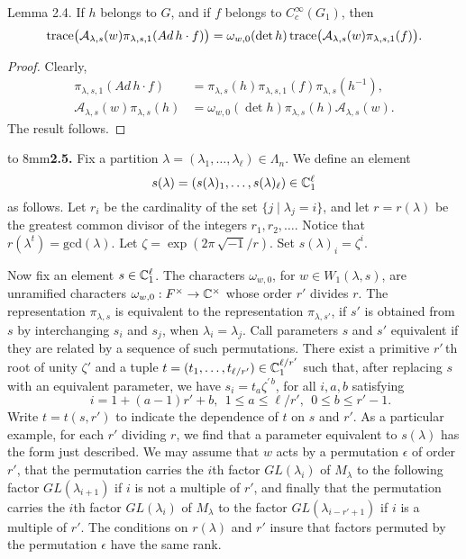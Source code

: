 \documentclass{amsart}
\begin{document}
\proclaim Lemma {2.4}.
If
  $ h $ belongs to $G$,
  and if $ f$ belongs to $C_c^{\infty} (G_1) $, then
%
$$
  \text{{\rm trace}}
  \bigl(
    {\mathcal A}_{\lambda,s} (w)
    \pi_{\lambda,s,1}
    (Ad\,h \cdot f)
  \bigr) 
=
  \omega_{w,0} 
  (\det h) \,
  \text{{\rm trace}}
  \bigl(
    {\mathcal A}_{\lambda,s} (w)
    \pi_{\lambda,s,1}
    (f)
  \bigr) .
$$
%
\finishproclaim

\begin{proof}
Clearly,
%
\begin{align*}
  \pi_{\lambda,s,1} (Ad\,h \cdot f)
&=
  \pi_{\lambda,s}(h)
  \pi_{\lambda,s,1} (f) 
  \pi_{\lambda,s} (h^{-1}) ,
\\
  {\mathcal A}_{\lambda,s} (w)
  \pi_{\lambda,s} (h) 
&=
  \omega_{w,0} (\det h)
  \pi_{\lambda,s} (h) 
  {\mathcal A}_{\lambda,s} (w).
\end{align*}
%
The result follows.
\end{proof}

\noindent
\hbox to 8mm{{\bf 2.5.}\hfil}
Fix a partition $\lambda =(\lambda_1,\ldots,\lambda_\ell)\in \Lambda_n$. We
define an element $$s(\lambda)=(s(\lambda)_1,\ldots,s(\lambda)_\ell)\in
{\Bbb C}_1^\ell$$ as follows.  Let $r_i$ be the cardinality of the
set $\{j\mid \lambda_j = i\}$, and let $r=r(\lambda)$ be the greatest
common divisor of the integers $r_1,r_2,\ldots$.  Notice that $r(\lambda^t) = \text{gcd}(\lambda)$.
Let $\zeta=\exp(2\pi\,\sqrt{-1}/r)$.  Set $s(\lambda)_i = \zeta^i$.

Now fix an element
  $s \in {\Bbb C}^\ell_1$.
The characters 
  $ \omega_{w,0} $, for
  $w \in W_1(\lambda,s) $,
are unramified characters
  $ \omega_{w,0}: F^{\times} \to {\Bbb C}^{\times} $
whose order $r'$ divides $r$.
The representation $\pi_{\lambda,s}$ is equivalent to the representation
$\pi_{\lambda,s'}$, if $s'$ is obtained from $s$ by interchanging
$s_i$ and $s_j$, when $\lambda_i=\lambda_j$.  Call parameters $s$ and $s'$
equivalent if they are related by a sequence of such permutations.
There exist a primitive $r'$\,th root of unity $\zeta'$ and a
tuple $t=(t_1,\ldots,t_{\ell/r'})\in {\Bbb C}^{\ell/r'}_1$ such that, after
replacing $s$ with an equivalent parameter, we have
$s_i = t_a\zeta^{\prime\,b}$, for all  $i,a,b$  satisfying 
	$$\quad i = 1+(a-1)r'+b,\ \ 1\le a\le \ell/r',\ \  0\le b\le r'-1.$$
Write $t = t(s,r')$ to indicate the dependence of $t$ on $s$ and $r'$.  As a particular
example, for each $r'$ dividing $r$, we find that a parameter equivalent to $s(\lambda)$ has the
form just described.
We may assume that $w$ acts by a permutation $\epsilon$ of order $r'$,
that the permutation carries the $i$th factor $GL(\lambda_i)$ of $M_\lambda$
to the following factor $GL(\lambda_{i+1})$ if $i$ is not a multiple of $r'$, and finally
that the permutation carries the $i$th factor $GL(\lambda_i)$ of $M_\lambda$
to the factor $GL(\lambda_{i-r'+1})$ if $i$ is a multiple of $r'$.
The conditions on $r(\lambda)$ and $r'$ insure that factors permuted by the
permutation $\epsilon$ have the same rank.
\end{document}
